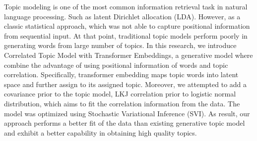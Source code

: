 Topic modeling is one of the most common information retrieval task in
natural language processing. Such as latent Dirichlet allocation (LDA).
However, as a classic statistical approach, which was not able to
capture positional information from sequential input. At that point,
traditional topic models perform poorly in generating words from large
number of topics. In this research, we introduce Correlated Topic Model
with Transformer Embeddings, a generative model where combine the
advantage of using positional information of words and topic
correlation. Specifically, transformer embedding maps topic words
into latent space and further assign to its assigned topic. Moreover, we
attempted to add a covariance prior to the topic model, LKJ correlation
prior to logistic normal distribution, which aims to fit the correlation
information from the data. The model was optimized using Stochastic
Variational Inference (SVI). As result, our approach performs a better
fit of the data than existing generative topic model and exhibit a
better capability in obtaining high quality topics.
